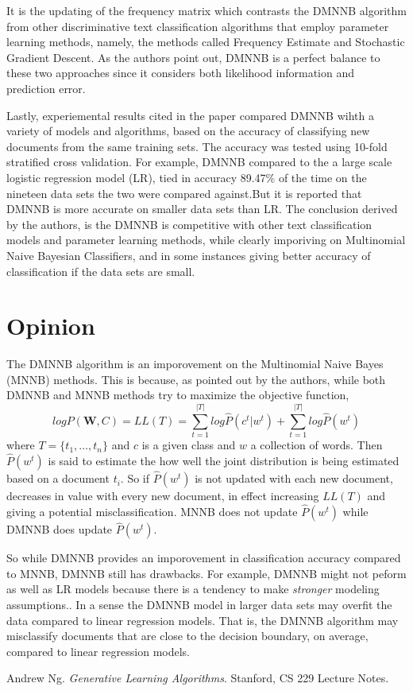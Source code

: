 \documentclass{article}
\begin{document}
It is the updating of the frequency matrix which contrasts the DMNNB algorithm from other discriminative text classification algorithms that employ parameter learning methods, namely, the methods called Frequency Estimate and Stochastic Gradient Descent. As the authors point out, DMNNB is a perfect balance to these two approaches since it considers both likelihood information and prediction error. 

Lastly, experiemental results cited in the paper compared DMNNB wihth a variety of models and algorithms, based on the accuracy of classifying new documents from the same training sets. The accuracy was tested using 10-fold stratified cross validation. For example, DMNNB compared to the a large scale logistic regression model (LR), tied in accuracy 89.47\% of the time on the nineteen data sets the two were compared against.But it is reported that DMNNB is more accurate on smaller data sets than LR. The conclusion derived by the authors, is the DMNNB is competitive with other text classification models and parameter learning methods, while clearly imporiving on Multinomial Naive Bayesian Classifiers, and in some instances giving better accuracy of classification if the data sets are small.

\section{Opinion}   
The DMNNB algorithm is an imporovement on the Multinomial Naive Bayes (MNNB) methods. This is because, as pointed out by the authors, while both DMNNB and MNNB methods try to maximize the objective function,
\[
logP(\textbf{W},C) = LL(T) = \sum_{t=1}^{|T|}log\widehat{P}(c^t|w^t) + \sum_{t=1}^{|T|}log\widehat{P}(w^t)
\] 
where $T = \{t_1,\dots,t_n\}$ and $c$ is a given class and $w$ a collection of words. Then $\widehat{P}(w^t)$ is said to estimate the how well the joint distribution is being estimated based on a document $t_i$. So if $\widehat{P}(w^t)$ is not updated with each new document, decreases in value with every new document, in effect increasing $LL(T)$ and giving a potential misclassification. MNNB does not update $\widehat{P}(w^t)$ while DMNNB does update $\widehat{P}(w^t)$.

So while DMNNB provides an imporovement in classification accuracy compared to MNNB, DMNNB still has drawbacks. For example, DMNNB might not peform as well as LR models because there is a tendency to make \textit{stronger} modeling assumptions.\cite{stanford}. In a sense the DMNNB model in larger data sets may overfit the data compared to linear regression models. That is, the DMNNB algorithm may misclassify documents that are close to the decision boundary, on average, compared to linear regression models.



\begin{thebibliography}{1}

   Andrew Ng. {\em Generative Learning Algorithms}. Stanford, CS 229 Lecture Notes.

\end{thebibliography} 
\end{document}
